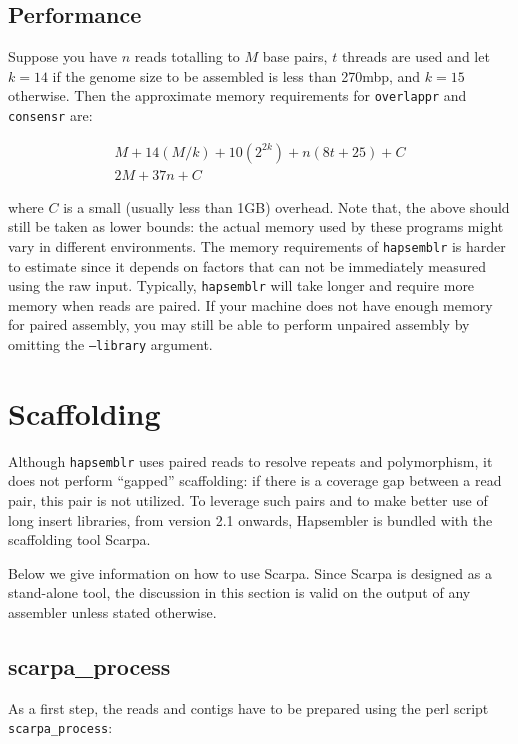 \documentclass[12pt,a4paper]{report}
\newcommand{\hapversion}{2.1}
\begin{document}
\subsection{Performance}

Suppose you have $n$ reads totalling to $M$ base pairs, $t$ threads are used and let $k=14$ if the genome size to be assembled is less than 270mbp, and $k=15$ otherwise. Then the approximate memory requirements for \texttt{overlappr} and \texttt{consensr} are:

\begin{eqnarray}
M + 14(M/k) + 10(2^{2k}) + n(8t + 25) + C \\
2M + 37n + C
\end{eqnarray}

where $C$ is a small (usually less than 1GB) overhead. Note that, the above should still be taken as lower bounds: the actual memory used by these programs might vary in different environments. The memory requirements of \texttt{hapsemblr} is harder to estimate since it depends on factors that can not be immediately measured using the raw input. Typically, \texttt{hapsemblr} will take longer and require more memory when reads are paired. If your machine does not have enough memory for paired assembly, you may still be able to perform unpaired assembly by omitting the \texttt{--library} argument.

\section{Scaffolding}
\label{scaff}

Although \texttt{hapsemblr} uses paired reads to resolve repeats and polymorphism, it does not perform ``gapped'' scaffolding: if there is a coverage gap between a read pair, this pair is not utilized. To leverage such pairs and to make better use of long insert libraries, from version \hapversion{} onwards, Hapsembler is bundled with the scaffolding tool Scarpa. 

Below we give information on how to use Scarpa. Since Scarpa is designed as a stand-alone tool, the discussion in this section is valid on the output of any assembler unless stated otherwise.

\subsection{scarpa\_process}

As a first step, the reads and contigs have to be prepared using the perl script \texttt{scarpa\_process}:
\end{document}

